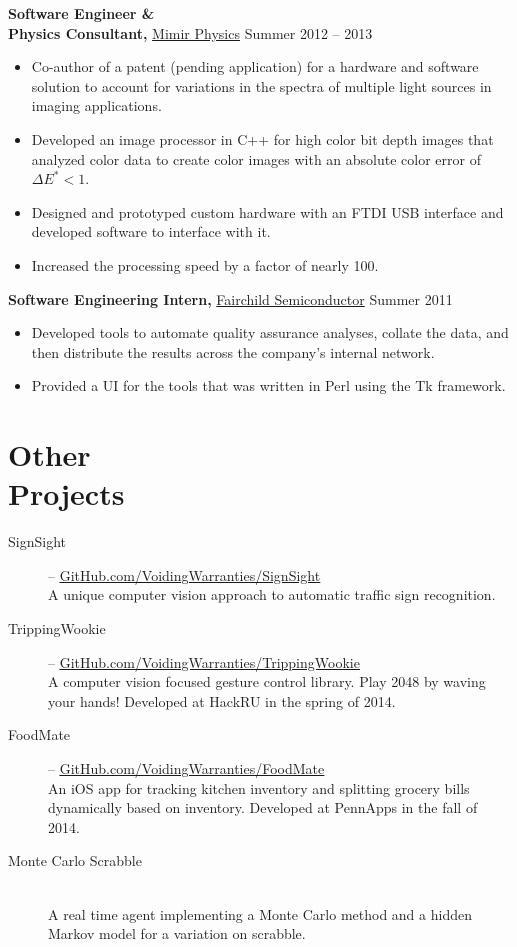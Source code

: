\documentclass[margin]{res}
\begin{document}
\begin{minipage}{\textwidth}
\begin{resume}
{\bf Software Engineer \& \\ Physics Consultant,} \uline{Mimir Physics} \hfill Summer 2012 -- 2013
 \begin{itemize} \itemsep -2pt  %
 \item Co-author of a patent (pending application) for a hardware and software solution to account for variations in the spectra of multiple light sources in imaging applications.
 \item Developed an image processor in C++ for high color bit depth images that analyzed color data to create color images with an absolute color error of $\Delta E^* < 1$.
 \item Designed and prototyped custom hardware with an FTDI USB interface  and developed software to interface with it.
 \item Increased the processing speed by a factor of nearly 100.
 \end{itemize}

 
 
{\bf Software Engineering Intern,} \uline{Fairchild Semiconductor} \hfill  Summer 2011
\begin{itemize} \itemsep -2pt %
 \item Developed tools to automate quality assurance analyses, collate the data, and then distribute the results across the company's internal network.
 \item Provided a UI for the tools that was written in Perl using the Tk framework.
\end{itemize}

\section{Other \\ Projects}
\begin{description}
	\item[SignSight] -- \uline{\href{http://GitHub.com/VoidingWarranties/SignSight}{GitHub.com/VoidingWarranties/SignSight}} \\
		A unique computer vision approach to automatic traffic sign recognition.
	\item[TrippingWookie] -- \uline{\href{http://GitHub.com/VoidingWarranties/TrippingWookie}{GitHub.com/VoidingWarranties/TrippingWookie}} \\
		A computer vision focused gesture control library. Play 2048 by waving your hands! Developed at HackRU in the spring of 2014.
	\item[FoodMate] -- \uline{\href{http://GitHub.com/VoidingWarranties/FoodMate}{GitHub.com/VoidingWarranties/FoodMate}} \\
		An iOS app for tracking kitchen inventory and splitting grocery bills dynamically based on inventory. Developed at PennApps in the fall of 2014.
	\item[Monte Carlo Scrabble] \hfil \\
		A real time agent implementing a Monte Carlo method and a hidden Markov model for a variation on scrabble.
\end{description}


\end{resume}
\end{minipage}
\end{document}
